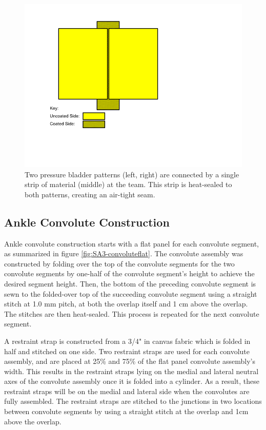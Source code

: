 \documentclass[defaultstyle,11pt]{thesis}
\begin{document}
\begin{figure}
\hypertarget{fig:SA3-seam}{%
\centering
\includegraphics{../fig/SA3/BladderSeam.png}
\caption{Two pressure bladder patterns (left, right) are connected by a single strip of material (middle) at the team. This strip is heat-sealed to both patterns, creating an air-tight seam.}\label{fig:SA3-seam}
}
\end{figure}

\hypertarget{ankle-convolute-construction}{%
\subsection{Ankle Convolute Construction}\label{ankle-convolute-construction}}

Ankle convolute construction starts with a flat panel for each convolute segment, as summarized in figure \ref{fig:SA3-convoluteflat}.
The convolute assembly was constructed by folding over the top of the convolute segments for the two convolute segments by one-half of the convolute segment's height to achieve the desired segment height.
Then, the bottom of the preceding convolute segment is sewn to the folded-over top of the succeeding convolute segment using a straight stitch at 1.0 mm pitch, at both the overlap itself and 1 cm above the overlap.
The stitches are then heat-sealed.
This process is repeated for the next convolute segment.

A restraint strap is constructed from a 3/4" in canvas fabric which is folded in half and stitched on one side.
Two restraint straps are used for each convolute assembly, and are placed at 25\% and 75\% of the flat panel convolute assembly's width.
This results in the restraint straps lying on the medial and lateral neutral axes of the convolute assembly once it is folded into a cylinder.
As a result, these restraint straps will be on the medial and lateral side when the convolutes are fully assembled.
The restraint straps are stitched to the junctions in two locations between convolute segments by using a straight stitch at the overlap and 1cm above the overlap.
\end{document}
